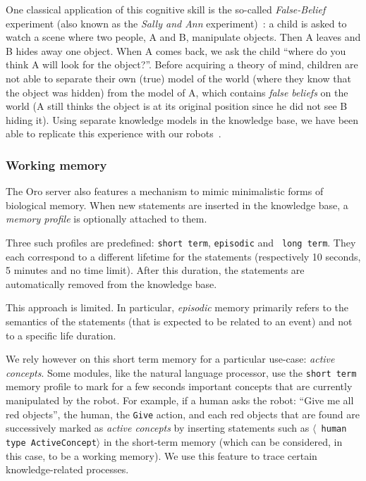 \documentclass[preprint,5p]{elsarticle}
\newcommand{\concept}[1]{{\small \texttt{#1}}}
\newcommand{\stmt}[1]{{\footnotesize \tt $\langle$ #1\relax$\rangle$}}
\begin{document}
One classical application of this cognitive skill is the so-called
\emph{False-Belief} experiment (also known as the \emph{Sally and Ann}
experiment)~\cite{Leslie2000}: a child is asked to watch a scene where two
people, A and B, manipulate objects. Then A leaves and B hides away one
object. When A comes back, we ask the child ``where do you think A will
look for the object?''. Before acquiring a theory of mind, children are not
able to separate their own (true) model of the world (where they know that
the object was hidden) from the model of A, which contains \emph{false
beliefs} on the world (A still thinks the object is at its original
position since he did not see B hiding it). Using separate knowledge models
in the knowledge base, we have been able to replicate this experience with
our robots~\cite{warnier2012when}.

\subsubsection{Working memory}

The {\sc Oro} server also features a mechanism to mimic minimalistic forms of
biological memory.  When new statements are inserted in the knowledge base, a
\emph{memory profile} is optionally attached to them.

Three such profiles are predefined: {\tt short term}, {\tt episodic} and {\tt
long term}. They each correspond to a different lifetime for the statements
(respectively 10 seconds, 5 minutes and no time limit). After this duration,
the statements are automatically removed from the knowledge base.

This approach is limited. In particular, \emph{episodic} memory primarily
refers to the semantics of the statements (that is expected to be related to an
event) and not to a specific life duration.

We rely however on this short term memory for a particular use-case:
\emph{active concepts}. Some modules, like the natural language processor, use
the {\tt short term} memory profile to mark for a few seconds important
concepts that are currently manipulated by the robot. For example, if a human
asks the robot: ``Give me all red objects'', the human, the \concept{Give}
action, and each red objects that are found are successively marked as
\emph{active concepts} by inserting statements such as \stmt{human type
ActiveConcept} in the short-term memory (which can be considered, in this case,
to be a working memory). We use this feature to trace certain knowledge-related
processes.
\end{document}
